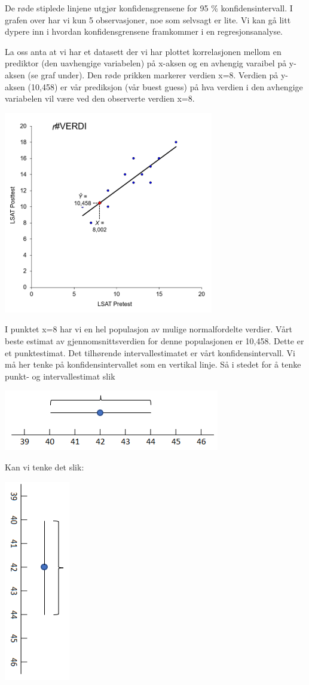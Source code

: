\documentclass[
]{article}
\begin{document}
De røde stiplede linjene utgjør konfidensgrensene for 95 \% konfidensintervall. I grafen over har vi kun 5 observasjoner, noe som selvsagt er lite. Vi kan gå litt dypere inn i hvordan konfidensgrensene framkommer i en regresjonsanalyse.

La oss anta at vi har et datasett der vi har plottet korrelasjonen mellom en prediktor (den uavhengige variabelen) på x-aksen og en avhengig varaibel på y-aksen (se graf under). Den røde prikken markerer verdien x=8. Verdien på y-aksen (10,458) er vår prediksjon (vår buest guess) på hva verdien i den avhengige variabelen vil være ved den observerte verdien x=8.

\includegraphics{Teori_fig6.png}

I punktet x=8 har vi en hel populasjon av mulige normalfordelte verdier. Vårt beste estimat av gjennomsnittsverdien for denne populasjonen er 10,458. Dette er et punktestimat. Det tilhørende intervallestimatet er vårt konfidensintervall. Vi må her tenke på konfidensintervallet som en vertikal linje. Så i stedet for å tenke punkt- og intervallestimat slik

\includegraphics{Teori_fig7.png}

Kan vi tenke det slik:

\includegraphics{Teori_fig8.png}
\end{document}
